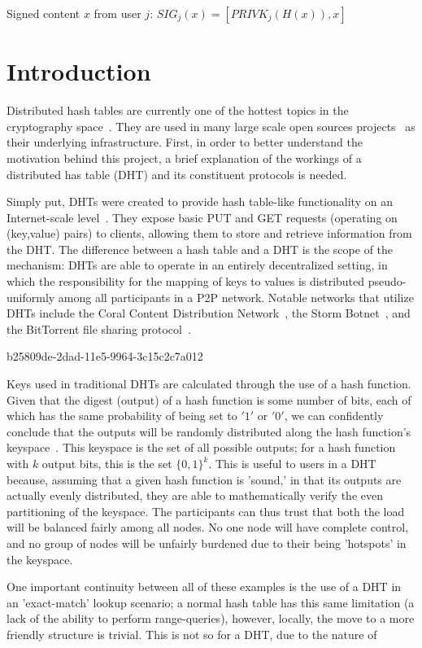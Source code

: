 \documentclass[12pt]{article}
\begin{document}
Signed content $x$ from user $j$: $SIG_j(x) = \left[ PRIVK_j( H(x) ), x \right]$

\section{Introduction}
\par Distributed hash tables are currently one of the hottest topics in the cryptography space~\cite{Stoica:2001dj,Rowstron:2001ea,Ratnasamy:2001wn}. They are used in many large scale open sources projects~\cite{Freitas:2013tb,Xu:2010vs,Perfitt:2010fh} as their underlying infrastructure. First, in order to better understand the motivation behind this project, a brief explanation of the workings of a distributed has table (DHT) and its constituent protocols is needed.

\par Simply put, DHTs were created to provide hash table-like functionality on an Internet-scale level~\cite{Ratnasamy:2001wn}. They expose basic PUT and GET requests (operating on (key,value) pairs) to clients, allowing them to store and retrieve information from the DHT. The difference between a hash table and a DHT is the scope of the mechanism: DHTs are able to operate in an entirely decentralized setting, in which the responsibility for the mapping of keys to values is distributed pseudo-uniformly among all participants in a P2P network. Notable networks that utilize DHTs include the Coral Content Distribution Network~\cite{Freedman:2004vb}, the Storm Botnet~\cite{Holz:2008uk}, and the BitTorrent file sharing protocol~\cite{Cohen:y1_8mBnw}.

b25809de-2dad-11e5-9964-3c15c2c7a012\par Keys used in traditional DHTs are calculated through the use of a hash function. Given that the digest (output) of a hash function is some number of bits, each of which has the same probability of being set to $'1'$ or $'0'$, we can confidently conclude that the outputs will be randomly distributed along the hash function's keyspace~. This keyspace is the set of all possible outputs; for a hash function with $k$ output bits, this is the set $\{0,1\}^k$. This is useful to users in a DHT because, assuming that a given hash function is 'sound,' in that its outputs are actually evenly distributed, they are able to mathematically verify the even partitioning of the keyspace. The participants can thus trust that both the load will be balanced fairly among all nodes. No one node will have complete control, and no group of nodes will be unfairly burdened due to their being 'hotspots' in the keyspace.~

\par One important continuity between all of these examples is the use of a DHT in an 'exact-match' lookup scenario; a normal hash table has this same limitation (a lack of the ability to perform range-queries), however, locally, the move to a more friendly structure is trivial. This is not so for a DHT, due to the nature of
\printbibliography
\end{document}
